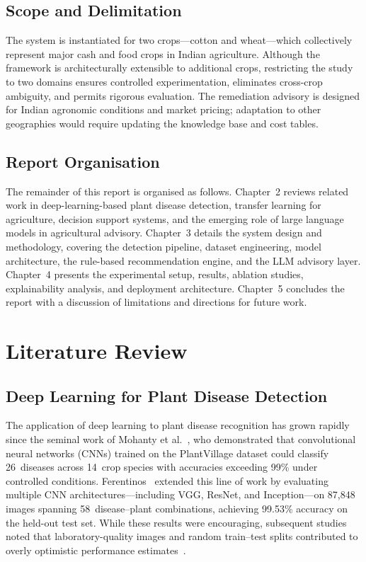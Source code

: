 \documentclass[12pt,a4paper]{report}
\begin{document}
\section{Scope and Delimitation}
The system is instantiated for two crops---cotton and wheat---which collectively represent major cash and food crops in Indian agriculture. Although the framework is architecturally extensible to additional crops, restricting the study to two domains ensures controlled experimentation, eliminates cross-crop ambiguity, and permits rigorous evaluation. The remediation advisory is designed for Indian agronomic conditions and market pricing; adaptation to other geographies would require updating the knowledge base and cost tables.

\section{Report Organisation}
The remainder of this report is organised as follows. Chapter~2 reviews related work in deep-learning-based plant disease detection, transfer learning for agriculture, decision support systems, and the emerging role of large language models in agricultural advisory. Chapter~3 details the system design and methodology, covering the detection pipeline, dataset engineering, model architecture, the rule-based recommendation engine, and the LLM advisory layer. Chapter~4 presents the experimental setup, results, ablation studies, explainability analysis, and deployment architecture. Chapter~5 concludes the report with a discussion of limitations and directions for future work.

\chapter{Literature Review}

\section{Deep Learning for Plant Disease Detection}
The application of deep learning to plant disease recognition has grown rapidly since the seminal work of Mohanty et al.~\cite{b7}, who demonstrated that convolutional neural networks (CNNs) trained on the PlantVillage dataset could classify 26~diseases across 14~crop species with accuracies exceeding 99\% under controlled conditions. Ferentinos~\cite{b5} extended this line of work by evaluating multiple CNN architectures---including VGG, ResNet, and Inception---on 87,848 images spanning 58~disease--plant combinations, achieving 99.53\% accuracy on the held-out test set. While these results were encouraging, subsequent studies noted that laboratory-quality images and random train--test splits contributed to overly optimistic performance estimates~\cite{b16,b6}.
\end{document}
